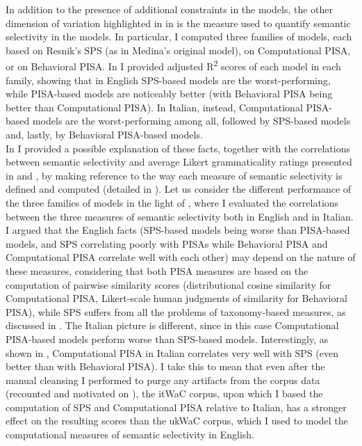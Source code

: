 In addition to the presence of additional constraints in the models, the other dimension of variation highlighted in  in  is the measure used to quantify semantic selectivity in the models. In particular, I computed three families of models, each based on Resnik's SPS (as in Medina's original model), on Computational PISA, or on Behavioral PISA. In  I provided adjusted R\textsuperscript{2} scores of each model in each family, showing that in English SPS-based models are the worst-performing, while PISA-based models are noticeably better (with Behavioral PISA being better than Computational PISA). In Italian, instead, Computational PISA-based models are the worst-performing among all, followed by SPS-based models and, lastly, by Behavioral PISA-based models.\\
In  I provided a possible explanation of these facts, together with the correlations between semantic selectivity and average Likert grammaticality ratings presented in  and , by making reference to the way each measure of semantic selectivity is defined and computed (detailed in ). Let us consider the different performance of the three families of models in the light of , where I evaluated the correlations between the three measures of semantic selectivity both in English and in Italian. I argued that the English facts (SPS-based models being worse than PISA-based models, and SPS correlating poorly with PISAs while Behavioral PISA and Computational PISA correlate well with each other) may depend on the nature of these measures, considering that both PISA measures are based on the computation of pairwise similarity scores (distributional cosine similarity for Computational PISA, Likert-scale human judgments of similarity for Behavioral PISA), while SPS suffers from all the problems of taxonomy-based measures, as discussed in . The Italian picture is different, since in this case Computational PISA-based models perform worse than SPS-based models. Interestingly, as shown in , Computational PISA in Italian correlates very well with SPS (even better than with Behavioral PISA). I take this to mean that even after the manual cleansing I performed to purge any artifacts from the corpus data (recounted and motivated on ), the itWaC corpus, upon which I based the computation of SPS and Computational PISA relative to Italian, has a stronger effect on the resulting scores than the ukWaC corpus, which I used to model the computational measures of semantic selectivity in English.\\
